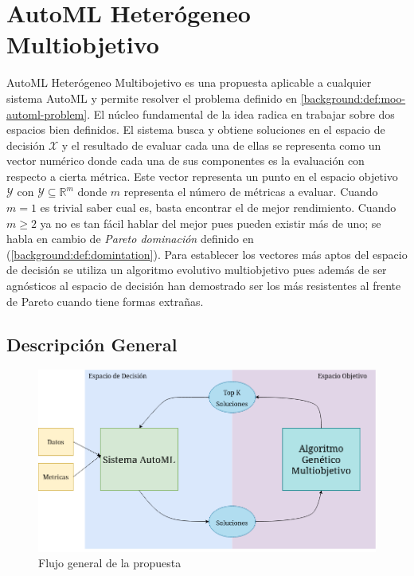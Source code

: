 
\chapter{AutoML Heter\'ogeneo Multiobjetivo}\label{chapter:proposal}

AutoML Heter\'ogeneo Multibojetivo es una propuesta aplicable a cualquier sistema AutoML y permite resolver el problema definido en \ref{background:def:moo-automl-problem}. El n\'ucleo fundamental de la idea radica en trabajar sobre dos espacios bien definidos. El sistema busca y obtiene soluciones en el espacio de decisi\'on $\mathcal{X}$ y el resultado  de evaluar cada una de ellas se representa como un vector num\'erico donde cada una de sus componentes es la evaluaci\'on con respecto a cierta m\'etrica. Este vector representa un punto en el espacio objetivo $\mathcal{Y}$ con $\mathcal{Y} \subseteq \mathbb{R}^m$ donde $m$ representa el n\'umero de m\'etricas a evaluar. Cuando $m = 1$ es trivial saber cual es, basta encontrar el de mejor rendimiento. Cuando $m \ge 2$ ya no es tan f\'acil hablar del mejor pues pueden existir m\'as de uno; se habla en cambio de \textit{Pareto dominaci\'on} definido en (\ref{background:def:domintation}). Para establecer los vectores  m\'as aptos del espacio de decisi\'on se utiliza un algoritmo evolutivo multiobjetivo pues adem\'as de ser agn\'osticos al espacio de decisi\'on han demostrado ser los m\'as resistentes al frente de Pareto cuando tiene formas extra\~nas.

\section{Descripci\'on General}
\begin{figure}[ht]
    \centering
    \includegraphics[scale=0.4]{Pictures/automl_moo_proposal2.png}
    \caption{Flujo general de la propuesta}
    \label{proposal:fig:flux}
\end{figure}

